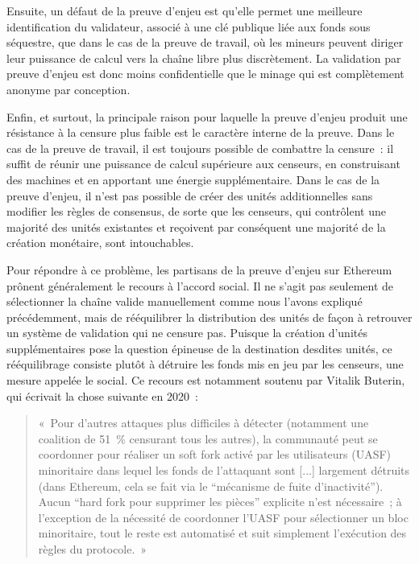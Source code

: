 Ensuite, un défaut de la preuve d'enjeu est qu'elle permet une meilleure identification du validateur, associé à une clé publique liée aux fonds sous séquestre, que dans le cas de la preuve de travail, où les mineurs peuvent diriger leur puissance de calcul vers la chaîne libre plus discrètement. La validation par preuve d'enjeu est donc moins confidentielle que le minage qui est complètement anonyme par conception.

Enfin, et surtout, la principale raison pour laquelle la preuve d'enjeu produit une résistance à la censure plus faible est le caractère interne de la preuve. Dans le cas de la preuve de travail, il est toujours possible de combattre la censure~: il suffit de réunir une puissance de calcul supérieure aux censeurs, en construisant des machines et en apportant une énergie supplémentaire. Dans le cas de la preuve d'enjeu, il n'est pas possible de créer des unités additionnelles sans modifier les règles de consensus, de sorte que les censeurs, qui contrôlent une majorité des unités existantes et reçoivent par conséquent une majorité de la création monétaire, sont intouchables.


Pour répondre à ce problème, les partisans de la preuve d'enjeu sur Ethereum prônent généralement le recours à l'accord social. Il ne s'agit pas seulement de sélectionner la chaîne valide manuellement comme nous l'avons expliqué précédemment, mais de rééquilibrer la distribution des unités de façon à retrouver un système de validation qui ne censure pas. Puisque la création d'unités supplémentaires pose la question épineuse de la destination desdites unités, ce rééquilibrage consiste plutôt à détruire les fonds mis en jeu par les censeurs, une mesure appelée le  social. Ce recours est notamment soutenu par Vitalik Buterin, qui écrivait la chose suivante en 2020~:

\begin{quote}
«~Pour d'autres attaques plus difficiles à détecter (notamment une coalition de 51~\% censurant tous les autres), la communauté peut se coordonner pour réaliser un soft fork activé par les utilisateurs (UASF) minoritaire dans lequel les fonds de l'attaquant sont [...] largement détruits (dans Ethereum, cela se fait via le “mécanisme de fuite d'inactivité”). Aucun “hard fork pour supprimer les pièces” explicite n'est nécessaire~; à l'exception de la nécessité de coordonner l'UASF pour sélectionner un bloc minoritaire, tout le reste est automatisé et suit simplement l'exécution des règles du protocole.~»
\end{quote}

